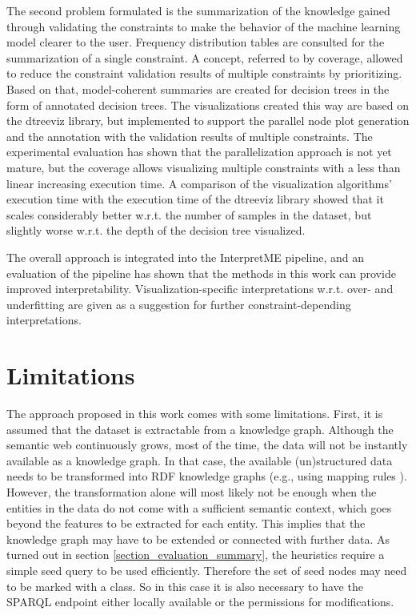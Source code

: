 The second problem formulated is the summarization of the knowledge gained through validating the constraints to make the behavior of the machine learning model clearer to the user. Frequency distribution tables are consulted for the summarization of a single constraint. A concept, referred to by coverage, allowed to reduce the constraint validation results of multiple constraints by prioritizing. Based on that, model-coherent summaries are created for decision trees in the form of annotated decision trees. The visualizations created this way are based on the dtreeviz library, but implemented to support the parallel node plot generation and the annotation with the validation results of multiple constraints. The experimental evaluation has shown that the parallelization approach is not yet mature, but the coverage allows visualizing multiple constraints with a less than linear increasing execution time. A comparison of the visualization algorithms' execution time with the execution time of the dtreeviz library showed that it scales considerably better w.r.t. the number of samples in the dataset, but slightly worse w.r.t. the depth of the decision tree visualized. %

The overall approach is integrated into the InterpretME pipeline, and an evaluation of the pipeline has shown that the methods in this work can provide improved interpretability. Visualization-specific interpretations w.r.t. over- and underfitting are given as a suggestion for further constraint-depending interpretations.

\section{Limitations}
The approach proposed in this work comes with some limitations. 
First, it is assumed that the dataset is extractable from a knowledge graph. Although the semantic web continuously grows, most of the time, the data will not be instantly available as a knowledge graph. In that case, the available (un)structured data needs to be transformed into RDF knowledge graphs (e.g., using mapping rules \cite{rdfizer}). However, the transformation alone will most likely not be enough when the entities in the data do not come with a sufficient semantic context, which goes beyond the features to be extracted for each entity. This implies that the knowledge graph may have to be extended or connected with further data. As turned out in section \ref{section_evaluation_summary}, the heuristics require a simple seed query to be used efficiently. Therefore the set of seed nodes may need to be marked with a class. So in this case it is also necessary to have the SPARQL endpoint either locally available or the permissions for modifications.

